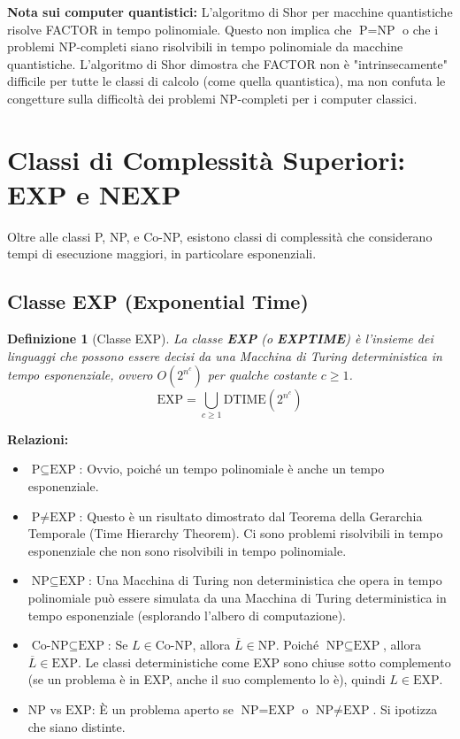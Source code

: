 \documentclass[a4paper]{article}
\newtheorem{definition}{Definizione}
\begin{document}
\textbf{Nota sui computer quantistici:} L'algoritmo di Shor per macchine quantistiche risolve FACTOR in tempo polinomiale. Questo non implica che $\text{P} = \text{NP}$ o che i problemi NP-completi siano risolvibili in tempo polinomiale da macchine quantistiche. L'algoritmo di Shor dimostra che FACTOR non è "intrinsecamente" difficile per tutte le classi di calcolo (come quella quantistica), ma non confuta le congetture sulla difficoltà dei problemi NP-completi per i computer classici.

\section{Classi di Complessità Superiori: EXP e NEXP}

Oltre alle classi P, NP, e Co-NP, esistono classi di complessità che considerano tempi di esecuzione maggiori, in particolare esponenziali.

\subsection{Classe EXP (Exponential Time)}
\begin{definition}[Classe EXP]
La classe \textbf{EXP} (o \textbf{EXPTIME}) è l'insieme dei linguaggi che possono essere decisi da una Macchina di Turing deterministica in tempo esponenziale, ovvero $O(2^{n^c})$ per qualche costante $c \ge 1$.
\[
\text{EXP} = \bigcup_{c \ge 1} \text{DTIME}(2^{n^c})
\]
\end{definition}

\textbf{Relazioni:}
\begin{itemize}
    \item $\text{P} \subseteq \text{EXP}$: Ovvio, poiché un tempo polinomiale è anche un tempo esponenziale.
    \item $\text{P} \neq \text{EXP}$: Questo è un risultato dimostrato dal Teorema della Gerarchia Temporale (Time Hierarchy Theorem). Ci sono problemi risolvibili in tempo esponenziale che non sono risolvibili in tempo polinomiale.
    \item $\text{NP} \subseteq \text{EXP}$: Una Macchina di Turing non deterministica che opera in tempo polinomiale può essere simulata da una Macchina di Turing deterministica in tempo esponenziale (esplorando l'albero di computazione).
    \item $\text{Co-NP} \subseteq \text{EXP}$: Se $L \in \text{Co-NP}$, allora $\overline{L} \in \text{NP}$. Poiché $\text{NP} \subseteq \text{EXP}$, allora $\overline{L} \in \text{EXP}$. Le classi deterministiche come EXP sono chiuse sotto complemento (se un problema è in EXP, anche il suo complemento lo è), quindi $L \in \text{EXP}$.
    \item $\text{NP}$ vs $\text{EXP}$: È un problema aperto se $\text{NP} = \text{EXP}$ o $\text{NP} \neq \text{EXP}$. Si ipotizza che siano distinte.
\end{itemize}
\end{document}
